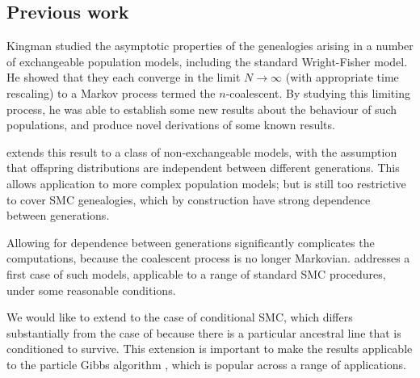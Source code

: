 \documentclass{article}
\begin{document}
\subsection{Previous work}
Kingman \citep{kingman1982gene, kingman1982coal, kingman1982exch} studied the asymptotic properties of the genealogies arising in a number of exchangeable population models, including the standard Wright-Fisher model. He showed that they each converge in the limit $N\to\infty$ (with appropriate time rescaling) to a Markov process termed the $n$-coalescent. By studying this limiting process, he was able to establish some new results about the behaviour of such populations, and produce novel derivations of some known results.

\citet{mohle1998} extends this result to a class of non-exchangeable models, with the assumption that offspring distributions are independent between different generations. This allows application to more complex population models; but is still too restrictive to cover SMC genealogies, which by construction have strong dependence between generations.

Allowing for dependence between generations significantly complicates the computations, because the coalescent process is no longer Markovian. \citet{koskela2018} addresses a first case of such models, applicable to a range of standard SMC procedures, under some reasonable conditions.

We would like to extend to the case of conditional SMC, which differs substantially from the case of \citet{koskela2018} because there is a particular ancestral line that is conditioned to survive. This extension is important to make the results applicable to the particle Gibbs algorithm \citep{andrieu2010}, which is popular across a range of applications.
\end{document}
